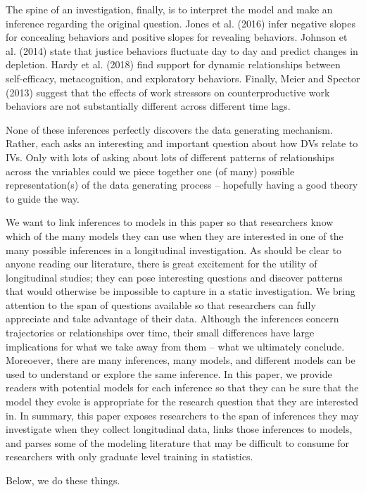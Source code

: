 \documentclass[english,,man]{apa6}
\theoremstyle{definition}
\theoremstyle{definition}
\theoremstyle{definition}
\theoremstyle{remark}
\begin{document}
The spine of an investigation, finally, is to interpret the model and
make an inference regarding the original question. Jones et al. (2016)
infer negative slopes for concealing behaviors and positive slopes for
revealing behaviors. Johnson et al. (2014) state that justice behaviors
fluctuate day to day and predict changes in depletion. Hardy et al.
(2018) find support for dynamic relationships between self-efficacy,
metacognition, and exploratory behaviors. Finally, Meier and Spector
(2013) suggest that the effects of work stressors on counterproductive
work behaviors are not substantially different across different time
lags.

None of these inferences perfectly discovers the data generating
mechanism. Rather, each asks an interesting and important question about
how DVs relate to IVs. Only with lots of asking about lots of different
patterns of relationships across the variables could we piece together
one (of many) possible representation(s) of the data generating process
-- hopefully having a good theory to guide the way.

We want to link inferences to models in this paper so that researchers
know which of the many models they can use when they are interested in
one of the many possible inferences in a longitudinal investigation. As
should be clear to anyone reading our literature, there is great
excitement for the utility of longitudinal studies; they can pose
interesting questions and discover patterns that would otherwise be
impossible to capture in a static investigation. We bring attention to
the span of questions available so that researchers can fully appreciate
and take advantage of their data. Although the inferences concern
trajectories or relationships over time, their small differences have
large implications for what we take away from them -- what we ultimately
conclude. Moreoever, there are many inferences, many models, and
different models can be used to understand or explore the same
inference. In this paper, we provide readers with potential models for
each inference so that they can be sure that the model they evoke is
appropriate for the research question that they are interested in. In
summary, this paper exposes researchers to the span of inferences they
may investigate when they collect longitudinal data, links those
inferences to models, and parses some of the modeling literature that
may be difficult to consume for researchers with only graduate level
training in statistics.

Below, we do these things.
\end{document}
